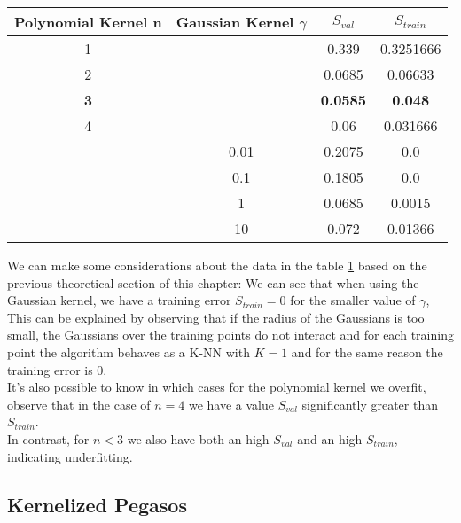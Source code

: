 \begin{table}[]
    \begin{tabular}{|c|c|c|c|}
        \hline
        Polynomial Kernel n & Gaussian Kernel $\gamma$ & $S_{val}$ & $S_{train}$ \\ \hline
        1 & & 0.339 & 0.3251666 \\ \hline
    2 & & 0.0685 & 0.06633 \\ \hline
    \textbf{3} & & \textbf{0.0585} & \textbf{0.048} \\ \hline
    4 & & 0.06 & 0.031666 \\ \hline
    & 0.01 & 0.2075 & 0.0 \\ \hline
    & 0.1 & 0.1805 & 0.0 \\ \hline
    & 1  & 0.0685 & 0.0015 \\ \hline
     & 10 & 0.072 & 0.01366 \\ \hline    
    \end{tabular}
    \label{tab:kper}
\end{table}
We can make some considerations about the data in the table \ref{tab:kper} based on the previous theoretical section of this chapter:
We can see that when using the Gaussian kernel, we have a training error $S_{train} = 0$ for the smaller value of $\gamma$, 
This can be explained by observing that if the radius of the Gaussians is too small, the Gaussians over the training points do not interact and for each training point the algorithm behaves as a K-NN with $K = 1$ and for the same reason the training error is 0.\\
It's also possible to know in which cases for the polynomial kernel we overfit, observe that in the case of $n = 4$ we have a value $S_{val}$ significantly greater than $S_{train}$.\\
In contrast, for $n < 3$ we also have both an high $S_{val}$ and an high $S_{train}$, indicating underfitting.\\
\subsection{Kernelized Pegasos}

